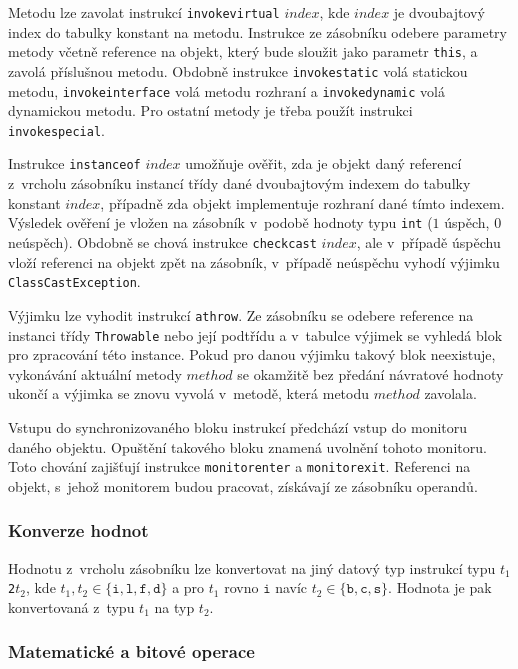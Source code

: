 Metodu lze zavolat instrukcí \texttt{invokevirtual} $index$, kde $index$ je dvoubajtový index do tabulky konstant na metodu. Instrukce ze zásobníku odebere parametry metody včetně reference na objekt, který bude sloužit jako parametr \texttt{this}, a zavolá příslušnou metodu. Obdobně instrukce \texttt{invokestatic} volá statickou metodu, \texttt{invokeinterface} volá metodu rozhraní a \texttt{invokedynamic} volá dynamickou metodu. Pro ostatní metody je třeba použít instrukci \texttt{invokespecial}.


Instrukce \texttt{instanceof} $index$ umožňuje ověřit, zda je objekt daný referencí z~vrcholu zásobníku instancí třídy dané dvoubajtovým indexem do tabulky konstant  $index$, případně zda objekt implementuje rozhraní dané tímto indexem. Výsledek ověření je vložen na zásobník v~podobě hodnoty typu \texttt{int} ($1$ úspěch, $0$ neúspěch). Obdobně se chová instrukce \texttt{checkcast} $index$, ale v~případě úspěchu vloží referenci na objekt zpět na zásobník, v~případě neúspěchu vyhodí výjimku \texttt{ClassCastException}.


Výjimku lze vyhodit instrukcí \texttt{athrow}. Ze zásobníku se odebere reference na instanci třídy \texttt{Throwable} nebo její podtřídu a v~tabulce výjimek se vyhledá blok pro zpracování této instance. Pokud pro danou výjimku takový blok neexistuje, vykonávání aktuální metody $method$ se okamžitě bez předání návratové hodnoty ukončí a výjimka se znovu vyvolá v~metodě, která metodu $method$ zavolala. 


Vstupu do synchronizovaného bloku instrukcí předchází vstup do monitoru daného objektu. Opuštění takového bloku znamená uvolnění tohoto monitoru. Toto chování zajišťují instrukce \texttt{monitorenter} a \texttt{monitorexit}. Referenci na objekt, s~jehož monitorem budou pracovat, získávají ze zásobníku operandů.

\subsubsection{Konverze hodnot}

Hodnotu z~vrcholu zásobníku lze konvertovat na jiný datový typ instrukcí typu $t_1$\texttt{2}$t_2$, kde $t_1, t_2 \in \{\texttt{i}, \texttt{l},\texttt{f},\texttt{d}\}$ a pro $t_1$ rovno $\texttt{i}$ navíc $t_2 \in \{\texttt{b}, \texttt{c},\texttt{s}\}$. Hodnota je pak konvertovaná z~typu $t_1$ na typ $t_2$.

\subsubsection{Matematické a bitové operace}

